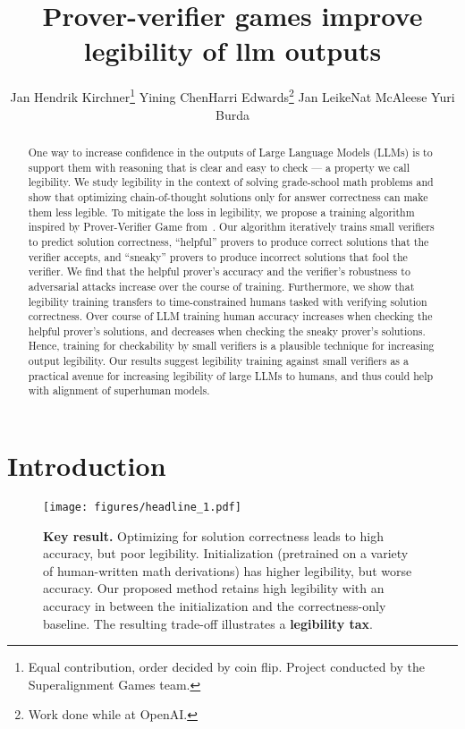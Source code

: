 \documentclass{article}
\title{Prover-verifier games improve \\ legibility of llm outputs}
\author{
Jan Hendrik Kirchner\thanks{Equal contribution, order decided by coin flip. Project conducted by the Superalignment Games team.} \And Yining Chen\footnotemark[1]  \AND Harri Edwards\thanks{Work done while at OpenAI.} \And Jan Leike\footnotemark[2]  \And Nat McAleese  \And Yuri Burda \footnotemark[2]
  \AND
  \normalfont{OpenAI}
}
\begin{document}
\maketitle

\begin{abstract}
One way to increase confidence in the outputs of Large Language Models (LLMs) is to support them with reasoning that is clear and easy to check --- a property we call legibility. We study legibility in the context of solving grade-school math problems and show that optimizing chain-of-thought solutions only for answer correctness can make them less legible. 
To mitigate the loss in legibility, we propose a training algorithm 
inspired by Prover-Verifier Game from~\citet{anil2021learning}. Our algorithm iteratively trains small verifiers to predict solution correctness, ``helpful'' provers to produce correct solutions that the verifier accepts, and ``sneaky'' provers to produce incorrect solutions that fool the verifier. We find that the helpful prover's accuracy and the verifier's robustness to adversarial attacks increase over the course of training. Furthermore, we show that legibility training transfers to time-constrained humans tasked with verifying solution correctness. Over course of LLM training human accuracy increases when checking the helpful prover’s solutions, and decreases when checking the sneaky prover’s solutions. Hence, training for checkability by small verifiers is a plausible technique for increasing output legibility. Our results suggest legibility training against small verifiers as a practical avenue for increasing legibility of large LLMs to humans, and thus could help with alignment of superhuman models.
\end{abstract}


\section{Introduction}

\begin{figure}
    \centering
    \texttt{[image: figures/headline\_1.pdf]}
    \caption{\textbf{Key result.} Optimizing for solution correctness leads to high accuracy, but poor legibility. Initialization (pretrained on a variety of human-written math derivations) has higher legibility, but worse accuracy. Our proposed method retains high legibility with an accuracy in between the initialization and the correctness-only baseline. The resulting trade-off illustrates a \textbf{legibility tax}.}
    \label{fig:headline}
\end{figure}
\end{document}
